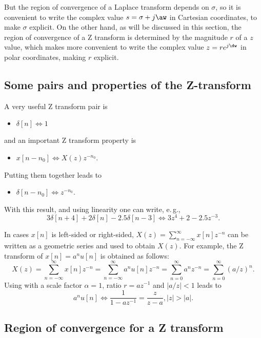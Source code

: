 But the region of convergence of a Laplace transform depends on $\sigma$, so it is convenient
to write the complex value $s = \sigma + j \aw$ in Cartesian coordinates, to make $\sigma$ explicit.
On the other hand, as will be discussed in this section, the region of convergence of a Z transform
is determined by the magnitude $r$ of a $z$ value, which makes more convenient to write the complex value $z = r e^{j \dw}$
in polar coordinates, making $r$ explicit.

\subsection{Some pairs and properties of the Z-transform}

A very useful Z transform pair is
\begin{itemize}
\item $\delta[n] \Leftrightarrow 1$ 
\end{itemize}
and an important Z transform property is
\begin{itemize}
\item $x[n-n_0] \Leftrightarrow X(z)z^{-n_0}$.
\end{itemize}
Putting them together leads to 
\begin{itemize}
\item $\delta[n-n_0] \Leftrightarrow z^{-n_0}$.
\end{itemize}
With this result, and using linearity one can write, e.\,g.,
\[
3\delta[n+4] + 2\delta[n] - 2.5\delta[n-3] \Leftrightarrow 3 z^{4} + 2 - 2.5 z^{-3}.
\]

In cases $x[n]$ is left-sided or right-sided, $X(z) = \sum_{n=-\infty}^\infty x[n] z^{-n}$ can be written as a geometric series and  used to obtain $X(z)$.
For example, the Z transform of $x[n] = a^n u[n]$ is obtained as follows:
\[
X(z) = \sum_{n=-\infty}^\infty x[n] z^{-n} = \sum_{n=-\infty}^\infty a^n u[n] z^{-n} =
\sum_{n=0}^\infty a^n z^{-n} = \sum_{n=0}^\infty (a/z)^n.
\]
Using  with a scale factor $\alpha=1$, ratio $r=a z^{-1}$ and $|a/z|<1$ leads to
\begin{equation}
a^n u[n] \Leftrightarrow \frac{1}{1 - az^{ -1 }} = \frac{z}{z - a}, \left| z \right| > \left| a \right|.
\label{eq:zOfExponential}
\end{equation}


\subsection{Region of convergence for a Z transform}

